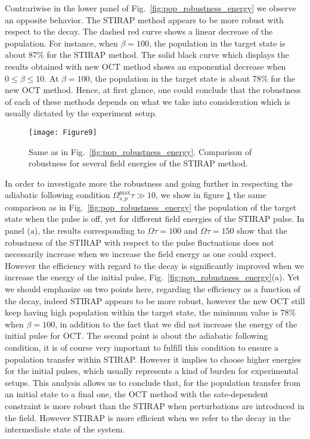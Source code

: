 \documentclass[]{interact}
\theoremstyle{plain}%
\theoremstyle{definition}
\theoremstyle{remark}
\begin{document}
Contrariwise in the lower panel of Fig.~\ref{fig:pop_robustness_energy} we 
observe an opposite behavior. The STIRAP method appears to be 
more robust with respect to the decay. The dashed red curve shows a linear 
decrease of the population. For instance, when $\beta=100$, 
the population in the target state is about 87\% for the STIRAP method. The
solid black curve which displays the results obtained with new OCT method shows 
an exponential decrease when $0\leq\beta\leq10$. At $\beta=100$, the population 
in the target state is about 78\% for the new OCT method.
Hence, at first glance, one could conclude that the robustness of each of these 
methods depends on what we take into consideration which is usually dictated by 
the experiment setup.
\begin{figure}[h!]
\centering
\texttt{[image: Figure9]}
\caption{ Same as in Fig.~\ref{fig:pop_robustness_energy}.
Comparison of robustness for several field energies of the STIRAP method.}
\label{fig:pop_robustness}
\end{figure}
In order to investigate more the robustness and going further in 
respecting the adiabatic following condition 
$\Omega_{s,p}^{\mathrm{max}}\tau\gg 
10$, we show in figure \ref{fig:pop_robustness} the same comparison as in
Fig.~\ref{fig:pop_robustness_energy} the population of the 
target state when the pulse is off, yet for different field energies of the 
STIRAP pulse. In panel (a), the results corresponding to $\Omega\tau=100$ and 
$\Omega\tau=150$ show that the robustness of the STIRAP with respect to the 
pulse fluctuations does not necessarily increase when we increase the field 
energy as one could expect. However the efficiency with regard to the 
decay is significantly improved when we increase the energy of the initial 
pulse, Fig.~\ref{fig:pop_robustness_energy}(a). Yet we 
should emphasize on two points here, regarding the efficiency as a function of 
the decay, indeed STIRAP appears to be more robust, however the new OCT 
still keep having high population within the target state, the minimum value is 
78\% when $\beta=100$, in addition to the fact that we did not increase the 
energy of the initial pulse for OCT. The second point is about the adiabatic 
following condition, it is of course very important to fulfill this condition 
to ensure a population transfer within STIRAP. However it implies to choose 
higher energies for the initial pulses, which usually represents a kind of 
burden for experimental setups.
This analysis allows us to conclude that, for the population transfer from an
initial state to a final one, the OCT method with the 
sate-dependent constraint is more robust than the STIRAP when perturbations are
introduced in the field. However STIRAP is more efficient when we refer to the 
decay in the intermediate
state of the system.  
\end{document}

